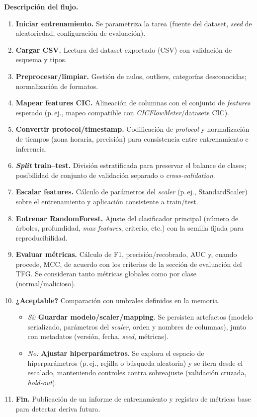 \textbf{Descripción del flujo.}
\begin{enumerate}
  \item \textbf{Iniciar entrenamiento.} Se parametriza la tarea (fuente del dataset, \emph{seed} de aleatoriedad, configuración de evaluación).
  \item \textbf{Cargar CSV.} Lectura del dataset exportado (CSV) con validación de esquema y tipos.
  \item \textbf{Preprocesar/limpiar.} Gestión de nulos, outliers, categorías desconocidas; normalización de formatos.
  \item \textbf{Mapear features CIC.} Alineación de columnas con el conjunto de \emph{features} esperado (p.\,ej., mapeo compatible con \emph{CICFlowMeter}/datasets CIC).
  \item \textbf{Convertir protocol/timestamp.} Codificación de \emph{protocol} y normalización de tiempos (zona horaria, precisión) para consistencia entre entrenamiento e inferencia.
  \item \textbf{\emph{Split} train–test.} División estratificada para preservar el balance de clases; posibilidad de conjunto de validación separado o \emph{cross-validation}.
  \item \textbf{Escalar features.} Cálculo de parámetros del \emph{scaler} (p.\,ej., StandardScaler) sobre el entrenamiento y aplicación consistente a train/test.
  \item \textbf{Entrenar RandomForest.} Ajuste del clasificador principal (número de árboles, profundidad, \emph{max features}, criterio, etc.) con la semilla fijada para reproducibilidad.
  \item \textbf{Evaluar métricas.} Cálculo de F1, precisión/recobrado, AUC y, cuando procede, MCC, de acuerdo con los criterios de la sección de evaluación del TFG. Se consideran tanto métricas globales como por clase (normal/malicioso).
  \item \textbf{¿Aceptable?} Comparación con umbrales definidos en la memoria.
  \begin{itemize}
    \item \emph{Sí:} \textbf{Guardar modelo/scaler/mapping}. Se persisten artefactos (modelo serializado, parámetros del \emph{scaler}, orden y nombres de columnas), junto con metadatos (versión, fecha, \emph{seed}, métricas).
    \item \emph{No:} \textbf{Ajustar hiperparámetros}. Se explora el espacio de hiperparámetros (p.\,ej., rejilla o búsqueda aleatoria) y se itera desde el escalado, manteniendo controles contra sobreajuste (validación cruzada, \emph{hold-out}).
  \end{itemize}
  \item \textbf{Fin.} Publicación de un informe de entrenamiento y registro de métricas base para detectar deriva futura.
\end{enumerate}

